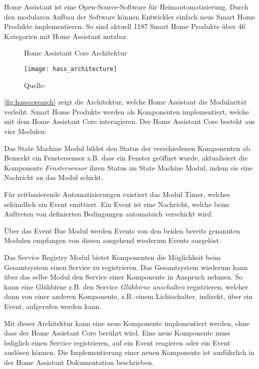 Home Assistant ist eine Open-Source-Software für Heimautomatisierung.
Durch den modularen Aufbau der Software können Entwickler einfach neue Smart Home Produkte implementieren.
So sind aktuell 1187 Smart Home Produkte über 46 Kategorien mit Home Assistant nutzbar.

\begin{figure}[ht]
	\centering
	\caption{Home Assistant Core Architektur}
	\texttt{[image: hass\_architecture]}
	\caption*{\footnotesize{Quelle: }}
	\label{fig:hasscorearch}
\end{figure}

\autoref{fig:hasscorearch} zeigt die Architektur, welche Home Assistant die Modularität verleiht.
Smart Home Produkte werden als Komponenten implementiert, welche mit dem Home Assistant Core interagieren.
Der Home Assistant Core besteht aus vier Modulen:

Das State Machine Modul bildet den Status der verschiedenen Komponenten ab.
Bemerkt ein Fenstersensor z.B. dass ein Fenster geöffnet wurde, aktualisiert die Komponente \textit{Fenstersensor} ihren Status im State Machine Modul, indem sie eine Nachricht an das Modul schickt.

Für zeitbasierende Automatisierungen existiert das Modul Timer, welches sekündlich ein Event emittiert.
Ein Event ist eine Nachricht, welche beim Auftreten von definierten Bedingungen automatsich verschickt wird.

Über das Event Bus Modul werden Events von den beiden bereits genannten Modulen empfangen von diesen ausgehend wiederum Events ausgelöst.

Das Service Registry Modul bietet Komponenten die Möglichkeit beim Gesamtsystem einen Service zu registrieren.
Das Gesamtsystem wiederum kann über das selbe Modul den Service einer Komponente in Anspruch nehmen.
So kann eine Glühbirne z.B. den Service \textit{Glühbirne anschalten} registrieren, welcher dann von einer anderen Komponente, z.B. einem Lichtschalter, indirekt, über ein Event, aufgerufen werden kann.

Mit dieser Architektur kann eine neue Komponente implementiert werden, ohne dass der Home Assistant Core berührt wird.
Eine neue Komponente muss lediglich einen Service registrieren, auf ein Event reagieren oder ein Event auslösen können.
Die Implementierung einer neuen Komponente ist ausführlich in der Home Assistant Dokumentation beschrieben.

